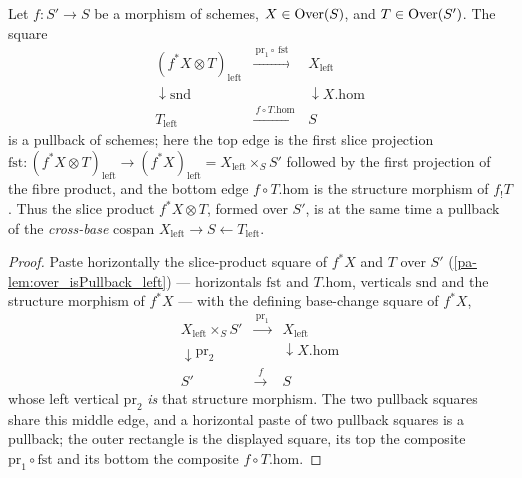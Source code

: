 \begin{theorem}
  \label{pa-thm:over_isPullback_crossBase}
  \leanok

  Let \(f : S' \to S\) be a morphism of schemes, \(X \in \mathrm{Over}(S)\), and
  \(T \in \mathrm{Over}(S')\). The square
  \[
    \begin{array}{ccc}
      (f^{*}X \otimes T)_{\mathrm{left}} &
        \xrightarrow{\ \mathrm{pr}_1 \circ\, \mathrm{fst}\ } & X_{\mathrm{left}} \\
      \downarrow \mathrm{snd} & & \downarrow X.\mathrm{hom} \\
      T_{\mathrm{left}} & \xrightarrow{\ f \circ T.\mathrm{hom}\ } & S
    \end{array}
  \]
  is a pullback of schemes; here the top edge is the first slice projection
  \(\mathrm{fst} : (f^{*}X \otimes T)_{\mathrm{left}} \to (f^{*}X)_{\mathrm{left}}
  = X_{\mathrm{left}} \times_S S'\) followed by the first projection of the fibre
  product, and the bottom edge \(f \circ T.\mathrm{hom}\) is the structure morphism of
  \(f_{!}T\). Thus the slice product \(f^{*}X \otimes T\), formed over \(S'\), is at the
  same time a pullback of the \emph{cross-base} cospan
  \(X_{\mathrm{left}} \to S \leftarrow T_{\mathrm{left}}\).
\end{theorem}
\begin{proof}
  \leanok
  Paste horizontally the slice-product square of \(f^{*}X\) and \(T\) over \(S'\)
  (\ref{pa-lem:over_isPullback_left}) --- horizontals \(\mathrm{fst}\) and
  \(T.\mathrm{hom}\), verticals \(\mathrm{snd}\) and the structure morphism of
  \(f^{*}X\) --- with the defining base-change square of \(f^{*}X\),
  \[
    \begin{array}{ccc}
      X_{\mathrm{left}} \times_S S' & \xrightarrow{\ \mathrm{pr}_1\ } &
        X_{\mathrm{left}} \\
      \downarrow \mathrm{pr}_2 & & \downarrow X.\mathrm{hom} \\
      S' & \xrightarrow{\ f\ } & S
    \end{array}
  \]
  whose left vertical \(\mathrm{pr}_2\) \emph{is} that structure morphism. The two
  pullback squares share this middle edge, and a horizontal paste of two pullback
  squares is a pullback; the outer rectangle is the displayed square, its top the
  composite \(\mathrm{pr}_1 \circ \mathrm{fst}\) and its bottom the composite
  \(f \circ T.\mathrm{hom}\).
\end{proof}


